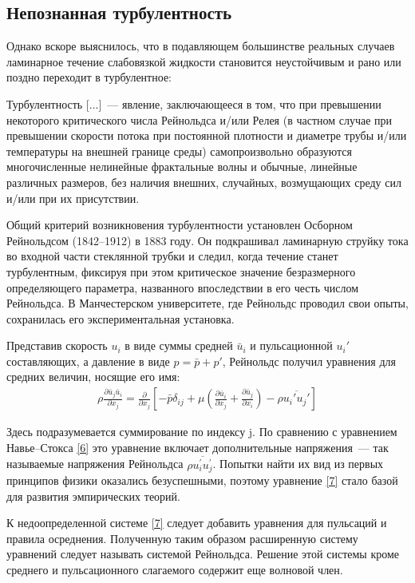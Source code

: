 \subsection{Непознанная турбулентность}

Однако вскоре выяснилось, что в подавляющем большинстве реальных случаев ламинарное течение слабовязкой жидкости 
становится неустойчивым и рано или поздно переходит в турбулентное:

Турбулентность [...]~--- явление, заключающееся в том, что при превышении некоторого критического числа 
Рейнольдса и/или Релея (в частном случае при превышении скорости потока при постоянной плотности и диаметре
трубы и/или температуры на внешней границе среды) самопроизвольно образуются многочисленные нелинейные 
фрактальные волны и обычные, линейные различных размеров, без наличия внешних, случайных, возмущающих 
среду сил и/или при их присутствии.

Общий критерий возникновения турбулентности установлен Осборном Рейнольдсом (1842--1912) в 1883 году. 
Он подкрашивал ламинарную струйку тока во входной части стеклянной трубки и следил, когда течение станет 
турбулентным, фиксируя при этом критическое значение безразмерного определяющего параметра, названного 
впоследствии в его честь числом Рейнольдса. В Манчестерском университете, где Рейнольдс проводил свои опыты, 
сохранилась его экспериментальная установка.

Представив скорость $u_i$ в виде суммы средней $\bar u_i$ и пульсационной $u_i'$ составляющих, а давление 
в виде $p=\bar p+p'$, Рейнольдс получил уравнения для средних величин, носящие его имя:
\begin{gather}
\rho\frac{\partial \bar u_j \bar u_i}{\partial x_j} = \frac{\partial}{\partial x_j}\left[ -\bar p \delta_{ij} +
\mu \left ( \frac{\partial \bar u_i}{\partial x_j} + \frac{\partial \bar u_j}{\partial x_i} \right) - 
\rho \overline{ u_i' u_j'} \right]
\label{7}
\end{gather}

Здесь подразумевается суммирование по индексу j. По сравнению с уравнением Навье--Стокса \ref{6} это 
уравнение включает дополнительные напряжения~--- так называемые напряжения Рейнольдса 
$\rho \overline{u_i^\prime u_j^\prime}$. Попытки найти их вид из первых принципов физики оказались безуспешными, 
поэтому уравнение \ref{7} стало базой для развития эмпирических теорий.

К недоопределенной системе \ref{7} следует добавить уравнения для пульсаций и правила осреднения. 
Полученную таким образом расширенную систему уравнений следует называть системой Рейнольдса. Решение 
этой системы кроме среднего и пульсационного слагаемого содержит еще волновой член.

